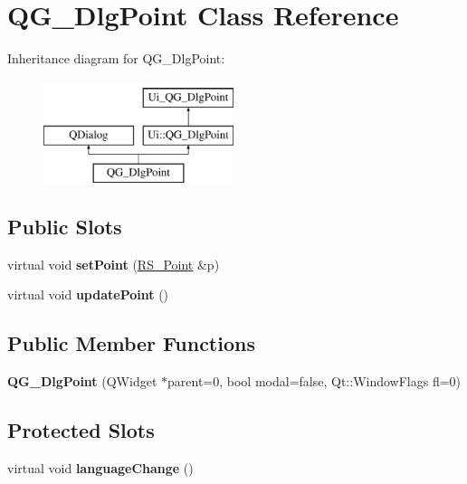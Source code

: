 \hypertarget{classQG__DlgPoint}{\section{Q\-G\-\_\-\-Dlg\-Point Class Reference}
\label{classQG__DlgPoint}
}
Inheritance diagram for Q\-G\-\_\-\-Dlg\-Point\-:\begin{figure}[H]
\begin{center}
\leavevmode
\includegraphics[height=3.000000cm]{classQG__DlgPoint}
\end{center}
\end{figure}
\subsection*{Public Slots}
\begin{DoxyCompactItemize}
\item 
\hypertarget{classQG__DlgPoint_a1b48b428ca15d2b41ea6672728a117fb}{virtual void {\bfseries set\-Point} (\hyperlink{classRS__Point}{R\-S\-\_\-\-Point} \&p)}\label{classQG__DlgPoint_a1b48b428ca15d2b41ea6672728a117fb}

\item 
\hypertarget{classQG__DlgPoint_acfbf10f3fdb643f53abcf72efae71a1d}{virtual void {\bfseries update\-Point} ()}\label{classQG__DlgPoint_acfbf10f3fdb643f53abcf72efae71a1d}

\end{DoxyCompactItemize}
\subsection*{Public Member Functions}
\begin{DoxyCompactItemize}
\item 
\hypertarget{classQG__DlgPoint_a2e7e8959253a2268c78468bb8f490964}{{\bfseries Q\-G\-\_\-\-Dlg\-Point} (Q\-Widget $\ast$parent=0, bool modal=false, Qt\-::\-Window\-Flags fl=0)}\label{classQG__DlgPoint_a2e7e8959253a2268c78468bb8f490964}

\end{DoxyCompactItemize}
\subsection*{Protected Slots}
\begin{DoxyCompactItemize}
\item 
\hypertarget{classQG__DlgPoint_aa63558a4b0d68d305f01b72aa5bb0559}{virtual void {\bfseries language\-Change} ()}\label{classQG__DlgPoint_aa63558a4b0d68d305f01b72aa5bb0559}

\end{DoxyCompactItemize}

